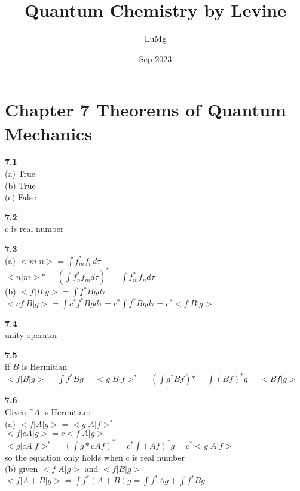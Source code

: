 \documentclass{article}
\title{Quantum Chemistry by Levine}
\author{LuMg}
\date{Sep 2023}
\begin{document}
\maketitle

\section{Chapter 7 Theorems of Quantum Mechanics}
\textbf{7.1}\\
(a) True\\
(b) True\\
(c) False\\
\newline

\textbf{7.2}\\
$c$ is real number\\
\newline

\textbf{7.3}\\
(a) $<m|n> = \int f_m^*f_nd\tau$\\
$<n|m>* = (\int f_n^*f_m d\tau)^* = \int f_m^*f_n d\tau$\\
(b) $<f|B|g> = \int f^*Bgd\tau$\\
$<cf|B|g> = \int c^*f^*Bgd\tau = c^*\int f^*Bgd\tau = c^*<f|B|g>$\\
\newline

\textbf{7.4}\\
unity operator\\
\newline

\textbf{7.5}\\
if $B$ is Hermitian\\
$<f|B|g> = \int f^*Bg  = <g|B|f>^* = (\int g^*Bf)* = \int (Bf)^*g = <Bf|g>$\\
\newline

\textbf{7.6}\\
Given $\^{A}$ is Hermitian:\\
(a) $<f|A|g> = <g|A|f>^*$\\
$<f|cA|g> = c<f|A|g>$\\
$<g|cA|f>^* = (\int g*cAf)^* = c^*\int (Af)^*g = c^*<g|A|f>$\\
so the equation only holds when c is real number\\
(b) given $<f|A|g>$ and $<f|B|g>$\\
$<f|A+B|g> = \int f^* (A+B)g = \int f^*Ag + \int f^*Bg$\\
\newline
\end{document}

